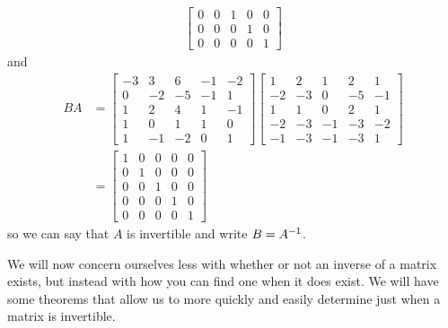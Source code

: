 \documentclass{ximera}
\begin{document}
\begin{example}
\begin{align*}
\begin{bmatrix}
      0 & 0 & 1 & 0 & 0\\
      0 & 0 & 0 & 1 & 0\\
      0 & 0 & 0 & 0 & 1
    \end{bmatrix}
\end{align*}
and
\begin{align*}
  BA
  &=
    \begin{bmatrix}
      -3 & 3 & 6 & -1 & -2 \\
      0 & -2 & -5 & -1 & 1 \\
      1 & 2 & 4 & 1 & -1 \\
      1 & 0 & 1 & 1 & 0 \\
      1 & -1 & -2 & 0 & 1
    \end{bmatrix}
                        \begin{bmatrix}
                          1 & 2 & 1 & 2 & 1 \\
                          -2 & -3 & 0 & -5 & -1 \\
                          1 & 1 & 0 & 2 & 1 \\
                          -2 & -3 & -1 & -3 & -2 \\
                          -1 & -3 & -1 & -3 & 1
                        \end{bmatrix} \\
  &=
    \begin{bmatrix}
      1 & 0 & 0 & 0 & 0\\
      0 & 1 & 0 & 0 & 0\\
      0 & 0 & 1 & 0 & 0\\
      0 & 0 & 0 & 1 & 0\\
      0 & 0 & 0 & 0 & 1
    \end{bmatrix}
\end{align*}
so we can say that $A$ is invertible and write $B=A^{-1}$.
\end{example}

We will now concern ourselves less with whether or not an inverse of a
matrix exists, but instead with how you can find one when it does
exist.  We will have some theorems that allow us to more quickly and
easily determine just when a matrix is invertible.
\end{document}
